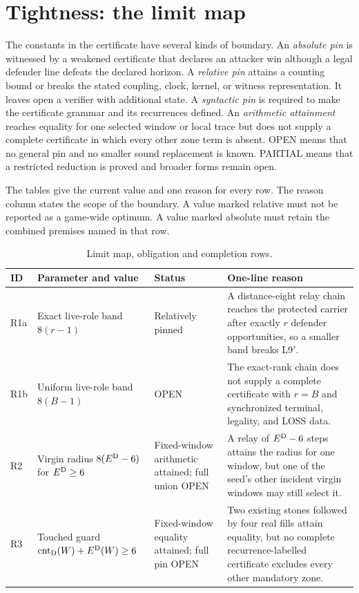 \section{Tightness: the limit map}
\label{sec:tightness}

The constants in the certificate have several kinds of boundary.  An
\emph{absolute pin} is witnessed by a weakened certificate that declares an
attacker win although a legal defender line defeats the declared horizon.  A
\emph{relative pin} attains a counting bound or breaks the stated coupling,
clock, kernel, or witness representation.  It leaves open a verifier with
additional state.  A \emph{syntactic pin} is required to make the certificate
grammar and its recurrences defined.  An \emph{arithmetic attainment} reaches
equality for one selected window or local trace but does not supply a complete
certificate in which every other zone term is absent.  OPEN means that no
general pin and no smaller sound replacement is known.  PARTIAL means that a
restricted reduction is proved and broader forms remain open.

The tables give the current value and one reason for every row.  The reason
column states the scope of the boundary.  A value marked relative must not be
reported as a game-wide optimum.  A value marked absolute must retain the
combined premises named in that row.

\begin{table}[p]
  \centering
  \caption{Limit map, obligation and completion rows.}
  \label{tab:tightness-obligations}
  \scriptsize
  \renewcommand{\arraystretch}{1.12}
  \begin{tabular}{@{}p{}p{}p{}p{}@{}}
    \toprule
    ID & Parameter and value & Status & One-line reason \\
    \midrule
    R1a & Exact live-role band $8(r-1)$ & Relatively pinned &
      A distance-eight relay chain reaches the protected carrier after
      exactly $r$ defender opportunities, so a smaller band breaks L9$'$. \\
    R1b & Uniform live-role band $8(B-1)$ & OPEN &
      The exact-rank chain does not supply a complete certificate with
      $r=B$ and synchronized terminal, legality, and LOSS data. \\
    R2 & Virgin radius $8(E^{\mathrm{D}}-6)$ for $E^{\mathrm{D}}\ge6$ & Fixed-window
      arithmetic attained; full union OPEN &
      A relay of $E^{\mathrm{D}}-6$ steps attains the radius for one window, but one
      of the seed's other incident virgin windows may still select it. \\
    R3 & Touched guard $\operatorname{cnt}_{\mathrm{D}}(W)+E^{\mathrm{D}}(W)\ge6$ & Fixed-window equality
      attained; full pin OPEN &
      Two existing stones followed by four real fills attain equality, but
      no complete recurrence-labelled certificate excludes every other
      mandatory zone. \\
    \bottomrule
  \end{tabular}
\end{table}

